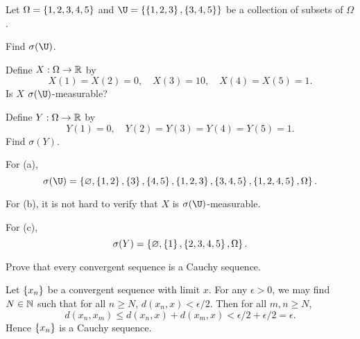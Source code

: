\begin{exercise}{2.18}\label{ex:2.18}
    Let $\Omega = \left\{ {1,2,3,4,5} \right\}$ and $\U = \set{\set{1,2,3}, \set{3,4,5}}$ 
    be a collection of subsets of $\Omega$.
    \begin{thmenum}
        \item Find $\sigma(\U)$. 
        \item Define $X:\Omega\to\mathbb{R}$ by
        \begin{equation*}
            X(1) = X(2) = 0,\quad X(3) = 10,\quad X(4) = X(5) = 1. 
        \end{equation*}
        Is $X$ $\sigma(\U)$-measurable?
        \item Define $Y:\Omega\to\mathbb{R}$ by
        \begin{equation*}
            Y(1) = 0,\quad Y(2) = Y(3) = Y(4) = Y(5) = 1.
        \end{equation*}
        Find $\sigma(Y)$. 
    \end{thmenum}
\end{exercise}
\begin{solution}
    For (a), 
    \begin{equation*}
        \sigma(\U) = \set{\varnothing, \set{1,2}, \set{3}, \set{4,5}, \set{1,2,3}, \set{3,4,5}, \set{1,2,4,5}, \Omega}.
    \end{equation*}
    
    For (b), it is not hard to verify that $X$ is $\sigma(\U)$-measurable. 

    For (c), 
    \begin{equation*}
        \sigma(Y) = \left\{ {\varnothing, \left\{ {1} \right\}, \left\{ {2,3,4,5} \right\}, \Omega} \right\}. 
    \end{equation*}
\end{solution}

\begin{exercise}{2.19}\label{ex:2.19}
    Prove that every convergent sequence is a Cauchy sequence.
\end{exercise}
\begin{solution}
    Let $\left\{ {x_n} \right\}$ be a convergent sequence with limit $x$. For any $\epsilon > 0$, 
    we may find $N\in\mathbb{N}$ such that for all $n\geq N$, $d(x_n, x)<\epsilon/2$. 
    Then for all $m,n\geq N$,
    \begin{equation*}
        d(x_n,x_m)\leq d(x_n, x) + d(x_m, x) < \epsilon/2 + \epsilon/2 = \epsilon.
    \end{equation*}
    Hence $\left\{ {x_n} \right\}$ is a Cauchy sequence.
\end{solution}

